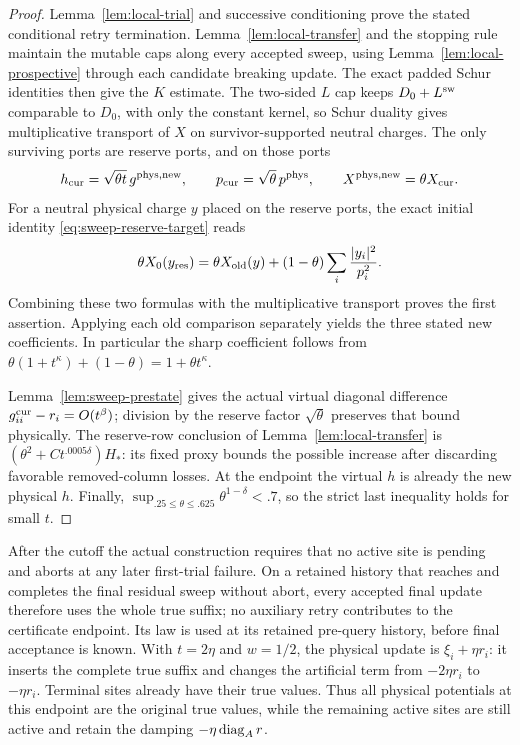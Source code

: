 \begin{proof}
Lemma~\ref{lem:local-trial} and successive conditioning prove the
stated conditional retry termination.  Lemma~\ref{lem:local-transfer}
and the stopping rule maintain the mutable caps along every accepted
sweep, using Lemma~\ref{lem:local-prospective} through each candidate
breaking update.  The exact padded Schur
identities then give the \(K\) estimate.  The two-sided \(L\) cap keeps
\(D_0+L^{\rm sw}\) comparable to \(D_0\), with only the constant kernel,
so Schur duality gives multiplicative transport of \(X\) on
survivor-supported neutral charges.  The only surviving ports
are reserve ports, and on those ports
\[
 h_{\rm cur}=\sqrt{\theta t}\,g^{\rm phys,new},\qquad
 p_{\rm cur}=\sqrt\theta\,p^{\rm phys},\qquad
 X^{\rm phys,new}=\theta X_{\rm cur}.
\]
For a neutral physical charge \(y\) placed on the reserve ports, the
exact initial identity \eqref{eq:sweep-reserve-target} reads
\[
 \theta X_0(y_{\rm res})=\theta X_{\rm old}(y)
             +(1-\theta)\sum_i\frac{|y_i|^2}{p_i^2}.
\]
Combining these two formulas with the multiplicative transport proves
the first assertion.  Applying each old comparison separately yields
the three stated new coefficients.  In particular the sharp
coefficient follows from
\(\theta(1+t^\kappa)+(1-\theta)=1+\theta t^\kappa\).

Lemma~\ref{lem:sweep-prestate} gives the actual virtual diagonal
difference \(g^{\rm cur}_{ii}-r_i=O(t^\beta)\); division by the reserve
factor \(\sqrt\theta\) preserves that bound physically.  The reserve-row
conclusion of Lemma~\ref{lem:local-transfer} is
\((\theta^2+Ct^{.0005\delta})H_*\): its fixed proxy bounds the possible
increase after discarding favorable removed-column losses.  At the endpoint the virtual \(h\) is
already the new physical \(h\).  Finally,
\(\sup_{.25\le\theta\le.625}\theta^{1-\delta}<.7\), so the strict
last inequality holds for small \(t\).
\end{proof}

After the cutoff the actual construction requires that no active site
is pending and aborts at any later first-trial failure.  On a retained
history that reaches and completes the final residual sweep without
abort, every accepted final update therefore uses the whole true suffix;
no auxiliary retry contributes to the certificate endpoint.  Its law is
used at its retained pre-query history, before final acceptance is known.
With \(t=2\eta\) and \(w=1/2\), the physical update is
\(\xi_i+\eta r_i\): it inserts the complete true suffix and changes the
artificial term from \(-2\eta r_i\) to \(-\eta r_i\).  Terminal sites
already have their true values.  Thus all physical potentials at this
endpoint are the original true values, while the remaining active sites
are still active and retain the damping \(-\eta\operatorname{diag}_A r\).
